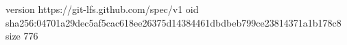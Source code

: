 version https://git-lfs.github.com/spec/v1
oid sha256:04701a29dec5af5cac618ee26375d14384461dbdbeb799ce23814371a1b178c8
size 776
